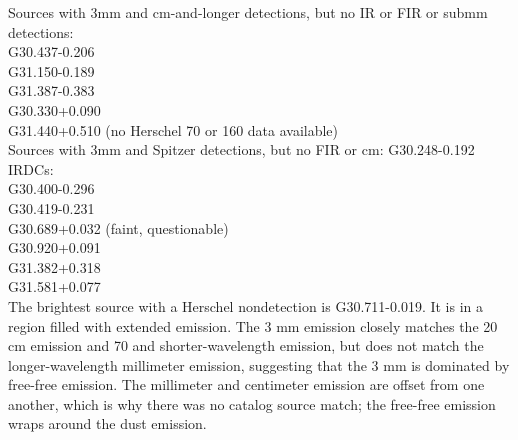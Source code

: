 \documentclass[twocolumn]{aastex62}
\begin{document}
Sources with 3mm and cm-and-longer detections, but no IR or FIR or submm detections:\\
G30.437-0.206 \\
G31.150-0.189 \\
G31.387-0.383 \\
G30.330+0.090 \\
G31.440+0.510 (no Herschel 70 \um or 160 \um data available) \\


Sources with 3mm and Spitzer detections, but no FIR or cm:
G30.248-0.192 \\

IRDCs:\\
G30.400-0.296 \\
G30.419-0.231 \\
G30.689+0.032 (faint, questionable)\\
G30.920+0.091 \\
G31.382+0.318 \\
G31.581+0.077 \\





The brightest source with a Herschel nondetection is G30.711-0.019.  It is in a
region filled with extended emission.  The 3 mm emission closely matches the 20
cm emission and 70 \um and shorter-wavelength emission, but does not match the
longer-wavelength millimeter emission, suggesting that the 3 mm is dominated by
free-free emission.  The millimeter and centimeter emission are offset from one
another, which is why there was no catalog source match; the free-free emission
wraps around the dust emission.
\end{document}
